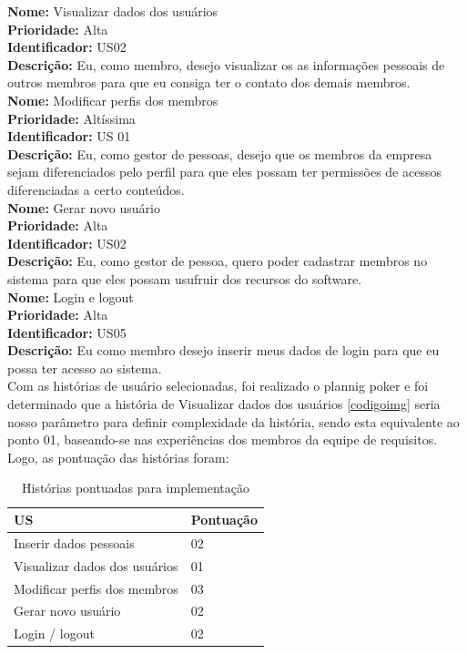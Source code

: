  \indent \textbf{Nome:} Visualizar dados dos usuários\\
 \indent \textbf{Prioridade:} Alta\\
 \indent \textbf{Identificador:} US02\\
 \indent \textbf{Descrição:} Eu, como membro, desejo visualizar os as informações pessoais de outros membros para que eu consiga ter o contato dos demais membros.\\

 \indent \textbf{Nome:} Modificar perfis dos membros\\
 \indent \textbf{Prioridade:} Altíssima\\
 \indent \textbf{Identificador:} US 01\\
 \indent \textbf{Descrição:} Eu, como gestor de pessoas, desejo que os membros da empresa sejam diferenciados pelo perfil para que eles possam ter permissões de acessos diferenciadas a certo conteúdos.\\

 \indent \textbf{Nome:} Gerar novo usuário\\
 \indent \textbf{Prioridade:} Alta\\
 \indent \textbf{Identificador:} US02\\
 \indent \textbf{Descrição:} Eu, como gestor de pessoa, quero poder cadastrar membros no sistema para que eles possam usufruir dos recursos do software.\\
             
 \indent \textbf{Nome:} Login e logout\\
 \indent \textbf{Prioridade:} Alta\\
 \indent \textbf{Identificador:} US05\\
 \indent \textbf{Descrição:} Eu como membro desejo inserir meus dados de login para que eu possa ter acesso ao sistema.\\

Com as histórias de usuário selecionadas, foi realizado o plannig poker e foi determinado que a história de Visualizar dados dos usuários \ref{codigoimg} seria nosso parâmetro para definir complexidade da história, sendo esta equivalente ao ponto 01, baseando-se nas experiências dos membros da equipe de requisitos. Logo, as pontuação das histórias foram: 

\begin{table}[H]
    \centering
    \label{historiasImplementar}
    \caption{Histórias pontuadas para implementação}
    \begin{tabular}{|l|l|}
        \hline
        US & Pontuação\\
        \hline
        Inserir dados pessoais &  02\\
        \hline
        Visualizar dados dos usuários & 01\\
        \hline
        Modificar perfis dos membros & 03\\
        \hline
        Gerar novo usuário & 02\\
        \hline 
        Login / logout & 02\\
        \hline
    \end{tabular}
\end{table}

